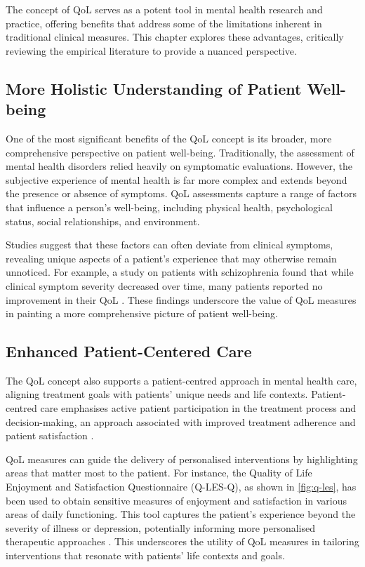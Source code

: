 \documentclass[10pt]{article}
\begin{document}
\begin{sloppypar}
  The concept of QoL serves as a potent tool in mental health research and practice, offering benefits that address some of the limitations inherent in traditional clinical measures. This chapter explores these advantages, critically reviewing the empirical literature to provide a nuanced perspective.

  \subsection{More Holistic Understanding of Patient Well-being}
  \label{subsec:holistic}
  One of the most significant benefits of the QoL concept is its broader, more comprehensive perspective on patient well-being. Traditionally, the assessment of mental health disorders relied heavily on symptomatic evaluations. However, the subjective experience of mental health is far more complex and extends beyond the presence or absence of symptoms. QoL assessments capture a range of factors that influence a person’s well-being, including physical health, psychological status, social relationships, and environment.

  Studies suggest that these factors can often deviate from clinical symptoms, revealing unique aspects of a patient’s experience that may otherwise remain unnoticed. For example, a study on patients with schizophrenia found that while clinical symptom severity decreased over time, many patients reported no improvement in their QoL \citep{eack_quality_2007}. These findings underscore the value of QoL measures in painting a more comprehensive picture of patient well-being.

  \subsection{Enhanced Patient-Centered Care}
  \label{subsec:patient-centered}
  The QoL concept also supports a patient-centred approach in mental health care, aligning treatment goals with patients’ unique needs and life contexts. Patient-centred care emphasises active patient participation in the treatment process and decision-making, an approach associated with improved treatment adherence and patient satisfaction \citep{dwamena_interventions_2012}.

  QoL measures can guide the delivery of personalised interventions by highlighting areas that matter most to the patient. For instance, the Quality of Life Enjoyment and Satisfaction Questionnaire (Q-LES-Q), as shown in \autoref{fig:q-les}, has been used to obtain sensitive measures of enjoyment and satisfaction in various areas of daily functioning. This tool captures the patient’s experience beyond the severity of illness or depression, potentially informing more personalised therapeutic approaches \citep{endicott_quality_1993}. This underscores the utility of QoL measures in tailoring interventions that resonate with patients’ life contexts and goals.


\end{sloppypar}
\end{document}
